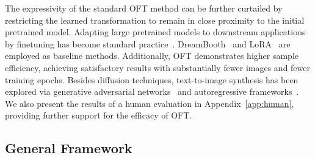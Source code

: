 The expressivity of the standard OFT method can be further curtailed by restricting the learned transformation to remain in close proximity to the initial pretrained model. Adapting large pretrained models to downstream applications by finetuning has become standard practice~\cite{devlin2018bert,brown2020language,he2022masked}. DreamBooth~\cite{ruiz2023dreambooth} and LoRA~\cite{hulora2022} are employed as baseline methods. Additionally, OFT demonstrates higher sample efficiency, achieving satisfactory results with substantially fewer images and fewer training epochs. Besides diffusion techniques, text-to-image synthesis has been explored via generative adversarial networks~\cite{reed2016generative,zhang2017stackgan,xu2018attngan,li2019controllable} and autoregressive frameworks~\cite{ramesh2021zero,ding2021cogview,wu2022nuwa,yuscaling}. We also present the results of a human evaluation in Appendix~\ref{app:human}, providing further support for the efficacy of OFT. \subsection{General Framework}

